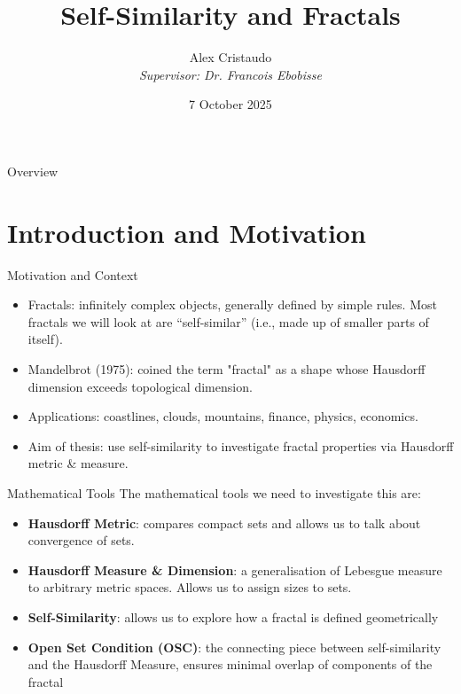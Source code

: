 \documentclass{beamer}
\title{Self-Similarity and Fractals}
\author[Alex Cristaudo]{%
  Alex Cristaudo\\[6pt]
  \small\textit{Supervisor: Dr. Francois Ebobisse}
}
\institute{University of Cape Town}
\date{7 October 2025}
\begin{document}
\begin{frame}
  \titlepage
\end{frame}

\begin{frame}{Overview}
\tableofcontents
\end{frame}

\section{Introduction and Motivation}
\begin{frame}{Motivation and Context}
\begin{itemize}
    \item Fractals: infinitely complex objects, generally defined by simple rules. Most fractals we will look at are ``self-similar'' (i.e., made up of smaller parts of itself).
        \item Mandelbrot (1975): coined the term "fractal" as a shape whose Hausdorff dimension exceeds topological dimension.
    \item Applications: coastlines, clouds, mountains, finance, physics, economics.
    \item Aim of thesis: use self-similarity to investigate fractal properties via Hausdorff metric \& measure.
\end{itemize}
\end{frame}

\begin{frame}{Mathematical Tools}
The mathematical tools we need to investigate this are:
\begin{itemize}
    \item \textbf{Hausdorff Metric}: compares compact sets and allows us to talk about convergence of sets.
    \item \textbf{Hausdorff Measure \& Dimension}: a generalisation of Lebesgue measure to arbitrary metric spaces. Allows us to assign sizes to sets.
    \item \textbf{Self-Similarity}: allows us to explore how a fractal is defined geometrically
    \item \textbf{Open Set Condition (OSC)}: the connecting piece between self-similarity and the Hausdorff Measure, ensures minimal overlap of components of the fractal
\end{itemize}
\end{frame}
\end{document}
